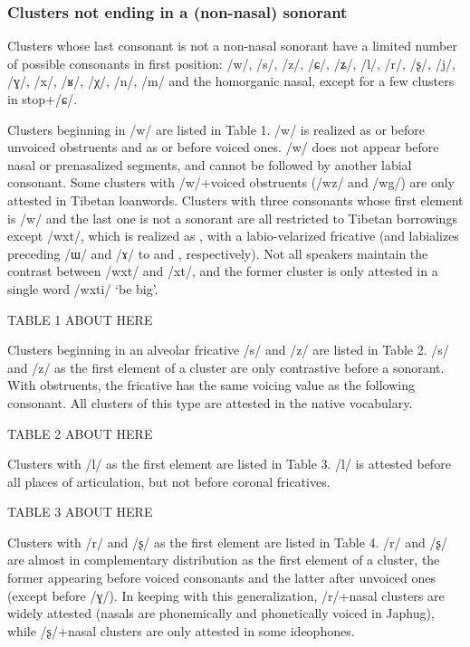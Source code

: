 \documentclass[12pt]{article}
\newcommand{\ipa}[1]{\mbox{\phon/#1/}}
\newcommand{\phonet}[1]{\mbox{\phon[#1]}}
\begin{document}
  
  \subsubsection*{Clusters not ending in a (non-nasal) sonorant}  
Clusters whose last consonant is not a non-nasal sonorant have a limited number of possible consonants in first position: \ipa{w}, \ipa{s}, \ipa{z}, \ipa{ɕ}, \ipa{ʑ}, \ipa{l}, \ipa{r}, \ipa{ʂ}, \ipa{j}, \ipa{ɣ}, \ipa{x}, \ipa{ʁ}, \ipa{χ}, \ipa{n}, \ipa{m} and the homorganic nasal, except for a few clusters in stop+\ipa{ɕ}.

 Clusters beginning in \ipa{w} are listed in Table 1.  \ipa{w} is realized as \phonet{f} or \phonet{ɸ} before unvoiced obstruents and as \phonet{v} or \phonet{β} before voiced ones. \ipa{w} does not appear before nasal or prenasalized segments, and cannot be followed by another labial consonant. Some clusters with \ipa{w}+voiced obstruents (\ipa{wz} and \ipa{wg}) are only attested in Tibetan loanwords. Clusters with three consonants whose first element is \ipa{w} and the last one is not a sonorant are all restricted to Tibetan borrowings except \ipa{wxt}, which is realized as \phonet{xʷt}, with a labio-velarized fricative (and labializes preceding \ipa{ɯ} and \ipa{ɤ} to \phonet{u} and \phonet{o}, respectively). Not all speakers maintain the contrast between \ipa{wxt} and \ipa{xt}, and the former cluster is only attested in a single word \ipa{wxti} `be big'.
 
TABLE 1 ABOUT HERE
  
 Clusters beginning in an alveolar fricative \ipa{s} and \ipa{z} are listed in Table 2.   \ipa{s} and \ipa{z} as the first element of a cluster are only contrastive before a sonorant. With obstruents, the fricative has the same voicing value as the following consonant. All clusters of this type are attested in the native vocabulary.


TABLE 2 ABOUT HERE
 
 Clusters with \ipa{l} as the first element are listed in Table 3.  \ipa{l} is attested before all places of articulation, but not before coronal fricatives.
 
TABLE 3 ABOUT HERE 
 
  Clusters with \ipa{r}  and \ipa{ʂ} as the first element are listed in Table 4. 
 \ipa{r} and \ipa{ʂ} are almost in complementary distribution as the first element of a cluster, the former appearing before voiced consonants and the latter after unvoiced ones (except before \ipa{ɣ}). In keeping with this generalization, \ipa{r}+nasal clusters are widely attested (nasals are phonemically and phonetically voiced in Japhug),  while \ipa{ʂ}+nasal clusters are only attested in some ideophones.
 
\end{document}
